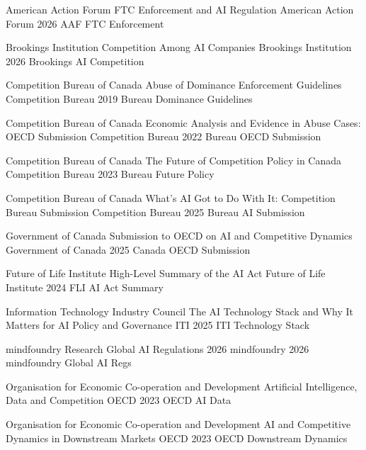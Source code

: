 
  {American Action Forum}
  {FTC Enforcement and AI Regulation}
  {American Action Forum}
  {2026}
  {AAF FTC Enforcement}

  {Brookings Institution}
  {Competition Among AI Companies}
  {Brookings Institution}
  {2026}
  {Brookings AI Competition}

  {Competition Bureau of Canada}
  {Abuse of Dominance Enforcement Guidelines}
  {Competition Bureau}
  {2019}
  {Bureau Dominance Guidelines}

  {Competition Bureau of Canada}
  {Economic Analysis and Evidence in Abuse Cases: OECD Submission}
  {Competition Bureau}
  {2022}
  {Bureau OECD Submission}

  {Competition Bureau of Canada}
  {The Future of Competition Policy in Canada}
  {Competition Bureau}
  {2023}
  {Bureau Future Policy}

  {Competition Bureau of Canada}
  {What's AI Got to Do With It: Competition Bureau Submission}
  {Competition Bureau}
  {2025}
  {Bureau AI Submission}

  {Government of Canada}
  {Submission to OECD on AI and Competitive Dynamics}
  {Government of Canada}
  {2025}
  {Canada OECD Submission}

  {Future of Life Institute}
  {High-Level Summary of the AI Act}
  {Future of Life Institute}
  {2024}
  {FLI AI Act Summary}

  {Information Technology Industry Council}
  {The AI Technology Stack and Why It Matters for AI Policy and Governance}
  {ITI}
  {2025}
  {ITI Technology Stack}

  {mindfoundry Research}
  {Global AI Regulations 2026}
  {mindfoundry}
  {2026}
  {mindfoundry Global AI Regs}

  {Organisation for Economic Co-operation and Development}
  {Artificial Intelligence, Data and Competition}
  {OECD}
  {2023}
  {OECD AI Data}

  {Organisation for Economic Co-operation and Development}
  {AI and Competitive Dynamics in Downstream Markets}
  {OECD}
  {2023}
  {OECD Downstream Dynamics}

